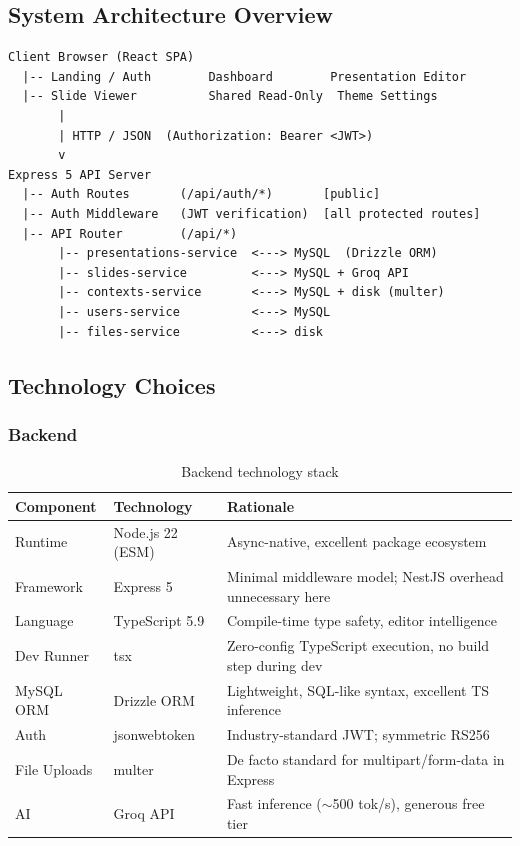 \documentclass[10pt,a4paper]{article}
\begin{document}
\subsection{System Architecture Overview}

\begin{lstlisting}[language={}, title={Simplified system layout}]
Client Browser (React SPA)
  |-- Landing / Auth        Dashboard        Presentation Editor
  |-- Slide Viewer          Shared Read-Only  Theme Settings
       |
       | HTTP / JSON  (Authorization: Bearer <JWT>)
       v
Express 5 API Server
  |-- Auth Routes       (/api/auth/*)       [public]
  |-- Auth Middleware   (JWT verification)  [all protected routes]
  |-- API Router        (/api/*)
       |-- presentations-service  <---> MySQL  (Drizzle ORM)
       |-- slides-service         <---> MySQL + Groq API
       |-- contexts-service       <---> MySQL + disk (multer)
       |-- users-service          <---> MySQL
       |-- files-service          <---> disk
\end{lstlisting}

\subsection{Technology Choices}

\subsubsection{Backend}

\begin{table}[H]
\centering\small
\renewcommand{\arraystretch}{1.2}
\begin{tabularx}{\linewidth}{@{} l l X @{}}
\toprule
\textbf{Component} & \textbf{Technology} & \textbf{Rationale} \\
\midrule
Runtime        & Node.js 22 (ESM)    & Async-native, excellent package ecosystem \\
Framework      & Express 5           & Minimal middleware model; NestJS overhead unnecessary here \\
Language       & TypeScript 5.9      & Compile-time type safety, editor intelligence \\
Dev Runner     & tsx                 & Zero-config TypeScript execution, no build step during dev \\
MySQL ORM      & Drizzle ORM         & Lightweight, SQL-like syntax, excellent TS inference \\
Auth           & jsonwebtoken        & Industry-standard JWT; symmetric RS256 \\
File Uploads   & multer              & De facto standard for multipart/form-data in Express \\
AI             & Groq API            & Fast inference ($\sim$500 tok/s), generous free tier \\
\bottomrule
\end{tabularx}
\vspace{-0.5em}\caption{Backend technology stack}
\end{table}
\end{document}
